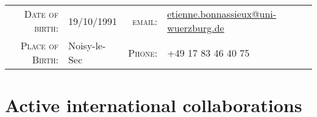 \documentclass[10pt]{article} %
\begin{document}
\pagestyle{empty} %




\par{\bigskip\par} %
\begin{center}
\begin{tabular}{rl|rl}
\textsc{Date of birth:} & 19/10/1991 &
\textsc{email:} & \href{mailto:etienne.bonnassieux@obspm.fr}{etienne.bonnassieux@uni-wuerzburg.de}\\
\textsc{Place of Birth:} &Noisy-le-Sec &
\textsc{Phone:} & +49 17 83 46 40 75
\end{tabular}
\end{center}

\vspace{0.5cm}


\section{Active international collaborations}
\end{document}
